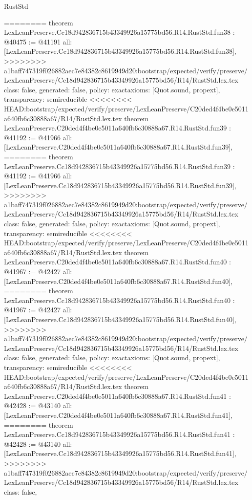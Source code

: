 \begin{lexlean}{RustStd}
\begin{coremodule}
{\begin{coremodule}
{{{{{{{{{{{{{{{{{{{{{{{{{{{{{{{{{{{{{{{{{========
theorem LexLeanPreserve.Cc18d942836715b43349926a15775bd56.R14.RustStd.fun38 : @40475 := @41191 {
  all: [LexLeanPreserve.Cc18d942836715b43349926a15775bd56.R14.RustStd.fun38],
>>>>>>>> a1baff747319f026882aec7e84382c8619949d20:bootstrap/expected/verify/preserve/LexLeanPreserve/Cc18d942836715b43349926a15775bd56/R14/RustStd.lex.tex
  class: false,
  generated: false,
  policy: exact{axioms: [Quot.sound, propext]},
  transparency: semireducible
}
<<<<<<<< HEAD:bootstrap/expected/verify/preserve/LexLeanPreserve/C20ded4f4be0e5011a640fb6c30888a67/R14/RustStd.lex.tex
theorem LexLeanPreserve.C20ded4f4be0e5011a640fb6c30888a67.R14.RustStd.fun39 : @41192 := @41966 {
  all: [LexLeanPreserve.C20ded4f4be0e5011a640fb6c30888a67.R14.RustStd.fun39],
========
theorem LexLeanPreserve.Cc18d942836715b43349926a15775bd56.R14.RustStd.fun39 : @41192 := @41966 {
  all: [LexLeanPreserve.Cc18d942836715b43349926a15775bd56.R14.RustStd.fun39],
>>>>>>>> a1baff747319f026882aec7e84382c8619949d20:bootstrap/expected/verify/preserve/LexLeanPreserve/Cc18d942836715b43349926a15775bd56/R14/RustStd.lex.tex
  class: false,
  generated: false,
  policy: exact{axioms: [Quot.sound, propext]},
  transparency: semireducible
}
<<<<<<<< HEAD:bootstrap/expected/verify/preserve/LexLeanPreserve/C20ded4f4be0e5011a640fb6c30888a67/R14/RustStd.lex.tex
theorem LexLeanPreserve.C20ded4f4be0e5011a640fb6c30888a67.R14.RustStd.fun40 : @41967 := @42427 {
  all: [LexLeanPreserve.C20ded4f4be0e5011a640fb6c30888a67.R14.RustStd.fun40],
========
theorem LexLeanPreserve.Cc18d942836715b43349926a15775bd56.R14.RustStd.fun40 : @41967 := @42427 {
  all: [LexLeanPreserve.Cc18d942836715b43349926a15775bd56.R14.RustStd.fun40],
>>>>>>>> a1baff747319f026882aec7e84382c8619949d20:bootstrap/expected/verify/preserve/LexLeanPreserve/Cc18d942836715b43349926a15775bd56/R14/RustStd.lex.tex
  class: false,
  generated: false,
  policy: exact{axioms: [Quot.sound, propext]},
  transparency: semireducible
}
<<<<<<<< HEAD:bootstrap/expected/verify/preserve/LexLeanPreserve/C20ded4f4be0e5011a640fb6c30888a67/R14/RustStd.lex.tex
theorem LexLeanPreserve.C20ded4f4be0e5011a640fb6c30888a67.R14.RustStd.fun41 : @42428 := @43140 {
  all: [LexLeanPreserve.C20ded4f4be0e5011a640fb6c30888a67.R14.RustStd.fun41],
========
theorem LexLeanPreserve.Cc18d942836715b43349926a15775bd56.R14.RustStd.fun41 : @42428 := @43140 {
  all: [LexLeanPreserve.Cc18d942836715b43349926a15775bd56.R14.RustStd.fun41],
>>>>>>>> a1baff747319f026882aec7e84382c8619949d20:bootstrap/expected/verify/preserve/LexLeanPreserve/Cc18d942836715b43349926a15775bd56/R14/RustStd.lex.tex
  class: false,
}}}}}}}}}}}}}}}}}}}}}}}}}}}}}}}}}}}}}}}}}}}}}
\end{coremodule}}
\end{coremodule}
\end{lexlean}
